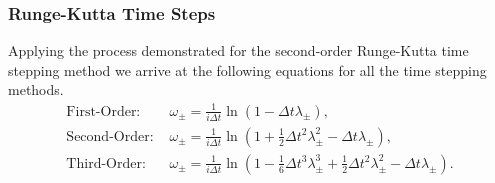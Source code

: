 \subsubsection{Runge-Kutta Time Steps}
Applying the process demonstrated for the second-order Runge-Kutta time stepping method we arrive at the following equations for all the time stepping methods.
\begin{align}
\label{eqn:taylorseries1}
\text{First-Order:    }&\omega_\pm = \frac{1}{i \Delta t} \ln\left(1 - \Delta t \lambda_\pm\right),\\
\text{Second-Order:    }&\omega_\pm = \frac{1}{i \Delta t} \ln\left(1 + \frac{1}{2}\Delta t^2 \lambda_\pm^2  -\Delta t\lambda_\pm\right),\\
\text{Third-Order:    }&\omega_\pm = \frac{1}{i \Delta t} \ln\left(1 - \frac{1}{6}\Delta t^3 \lambda_\pm^3 + \frac{1}{2}\Delta t^2 \lambda_\pm^2  -\Delta t\lambda_\pm\right).
\end{align}


